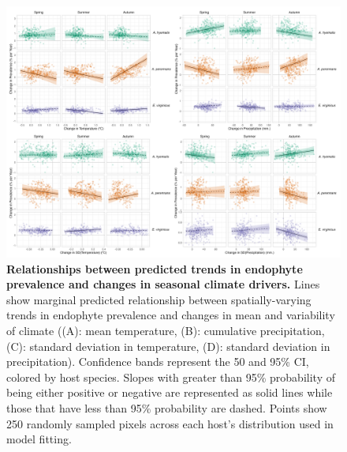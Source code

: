 \documentclass[11pt]{article}
\begin{document}
\begin{figure}[H]
	\centering
	\includegraphics[width = \linewidth]{../Plots/climate_trends_plot_intercept.png}
	\caption[Relationships between predicted trends in endophyte prevalence and changes in seasonal climate drivers.]{\textbf{Relationships between predicted trends in endophyte prevalence and changes in seasonal climate drivers.} Lines show marginal predicted relationship between spatially-varying trends in endophyte prevalence and changes in mean and variability of climate ((A): mean temperature, (B): cumulative precipitation, (C): standard deviation in temperature, (D): standard deviation in precipitation). Confidence bands represent the 50 and 95\% CI,  colored by host species. Slopes with greater than 95\% probability of being either positive or negative are represented as solid lines while those that have less than 95\% probability are dashed. Points show 250 randomly sampled pixels across each host's distribution used in model fitting.}
	\label{fig:climate_correlation_plot}
\end{figure}
\end{document}
